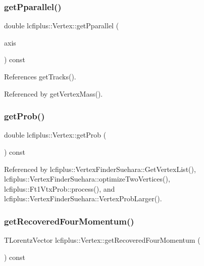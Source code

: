 \mbox{\label{classlcfiplus_1_1Vertex_ad910b0419d883121b1146b717527b80e}} 
\subsubsection{get\+Pparallel()}
{\footnotesize\ttfamily double lcfiplus\+::\+Vertex\+::get\+Pparallel (\begin{DoxyParamCaption}\item[{const T\+Vector3 \&}]{axis }\end{DoxyParamCaption}) const}



References get\+Tracks().



Referenced by get\+Vertex\+Mass().

\mbox{\label{classlcfiplus_1_1Vertex_a4b7a0a13abb54a6c2eb12811389e0371}} 
\subsubsection{get\+Prob()}
{\footnotesize\ttfamily double lcfiplus\+::\+Vertex\+::get\+Prob (\begin{DoxyParamCaption}{ }\end{DoxyParamCaption}) const\hspace{0.3cm}{\ttfamily [inline]}}



Referenced by lcfiplus\+::\+Vertex\+Finder\+Suehara\+::\+Get\+Vertex\+List(), lcfiplus\+::\+Vertex\+Finder\+Suehara\+::optimize\+Two\+Vertices(), lcfiplus\+::\+Ft1\+Vtx\+Prob\+::process(), and lcfiplus\+::\+Vertex\+Finder\+Suehara\+::\+Vertex\+Prob\+Larger().

\mbox{\label{classlcfiplus_1_1Vertex_acb2665ad8612568e9765837641f48772}} 
\subsubsection{get\+Recovered\+Four\+Momentum()}
{\footnotesize\ttfamily T\+Lorentz\+Vector lcfiplus\+::\+Vertex\+::get\+Recovered\+Four\+Momentum (\begin{DoxyParamCaption}{ }\end{DoxyParamCaption}) const\hspace{0.3cm}{\ttfamily [inline]}}

